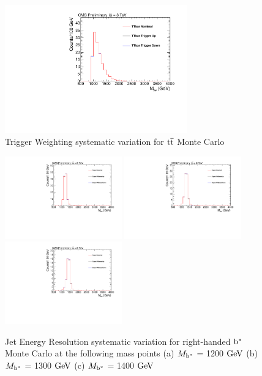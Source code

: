 \begin{figure}[htcb]
\begin{center}
\includegraphics[width=0.7\textwidth]{AN-14-049/figs/TTbar_TriggerWeighting}
\caption{Trigger Weighting systematic variation for $\mathrm{t\overline{t}}$ Monte Carlo}
\label{figs:bsttbartrig}
\end{center}
\end{figure}


\begin{figure}[htcb]
\begin{center}
\includegraphics[width=0.45\textwidth]{AN-14-049/figs/Signal_M1200_PtSmearing}
\includegraphics[width=0.45\textwidth]{AN-14-049/figs/Signal_M1300_PtSmearing}
\includegraphics[width=0.45\textwidth]{AN-14-049/figs/Signal_M1400_PtSmearing}
\caption{
Jet Energy Resolution systematic variation for right-handed $\mathrm{b}^{*}$  Monte Carlo at the following mass points
(a) $M_{\mathrm{b}^{*}}$ = 1200$~\mathrm{GeV}$ 
(b) $M_{\mathrm{b}^{*}}$ = 1300$~\mathrm{GeV}$
(c) $M_{\mathrm{b}^{*}}$ = 1400$~\mathrm{GeV}$ 
}
\label{figs:bssignalJER}
\end{center}
\end{figure}

